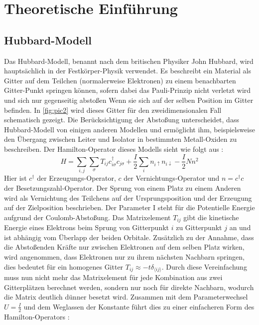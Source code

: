 \chapter{Theoretische Einführung}
\label{sec:theo}

\section{Hubbard-Modell}
Das Hubbard-Modell, benannt nach dem britischen Physiker John Hubbard, wird hauptsächlich in der Festkörper-Physik verwendet. Es beschreibt ein Material als Gitter auf dem Teilchen (normalerweise Elektronen) zu einem benachbarten Gitter-Punkt springen können, sofern dabei das Pauli-Prinzip nicht verletzt wird und sich nur gegenseitig abstoßen Wenn sie sich auf der selben Position im Gitter befinden. In \ref{fig:pic2} wird dieses Gitter für den zweidimensionalen Fall schematisch gezeigt. Die Berücksichtigung der Abstoßung unterscheidet, dass Hubbard-Modell von einigen anderen Modellen und ermöglicht ihm, beispielsweise den Übergang zwischen Leiter und Isolator in bestimmten Metall-Oxiden zu beschreiben. Der Hamilton-Operator dieses Modells sieht wie folgt aus \cite{Hubbard}:
\begin{equation}\label{Hubbard_original}
H = \sum_{i,j}\sum_{\sigma}T_{ij} c_{i\sigma}^\dag c_{j\sigma} + \frac{I}{2} \sum_{i}n_{i\uparrow}n_{i\downarrow} - \frac{I}{2}Nn^2
\end{equation}
Hier ist $ c^\dag $ der Erzeugungs-Operator, $ c $ der Vernichtungs-Operator und $ n = c^\dag c $ der Besetzungszahl-Operator. Der Sprung von einem Platz zu einem Anderen wird als Vernichtung des Teilchens auf der Ursprungsposition und der Erzeugung auf der Zielposition beschrieben. Der Parameter I steht für die Potentielle Energie aufgrund der Coulomb-Abstoßung. Das Matrixelement $ T_{ij} $ gibt die kinetische Energie eines Elektrons beim Sprung von Gitterpunkt $ i $ zu Gitterpunkt $ j $ an und ist abhängig vom Überlapp der beiden Orbitale. Zusätzlich zu der Annahme, dass die Abstoßenden Kräfte nur zwischen Elektronen auf dem selben Platz wirken, wird angenommen, dass Elektronen nur zu ihrem nächsten Nachbarn springen, dies bedeutet für ein homogenes Gitter $ T_{ij} \approx -t\delta_{\langle ij \rangle} $\cite{schoett2014}. Durch diese Vereinfachung muss nun nicht mehr das Matrixelement für jede Kombination aus zwei Gitterplätzen berechnet werden, sondern nur noch für direkte Nachbarn, wodurch die Matrix deutlich dünner besetzt wird. Zusammen mit dem Parameterwechsel $ U = \frac{I}{2} $ und dem Weglassen der Konstante führt dies zu einer einfacheren Form des Hamilton-Operators \cite{Rickayzen,schoett2014}:
